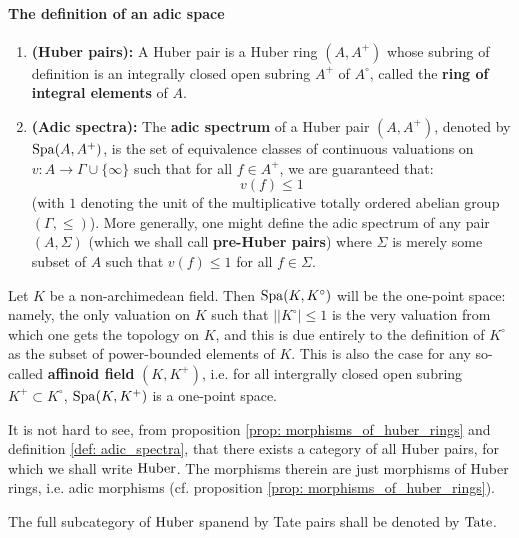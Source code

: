                 \paragraph{The definition of an adic space}
                    \begin{definition} \label{def: adic_spectra}
                        \noindent
                        \begin{enumerate}
                            \item \textbf{(Huber pairs):} A Huber pair is a Huber ring $(A, A^+)$ whose subring of definition is an integrally closed open subring $A^+$ of $A^{\circ}$, called the \textbf{ring of integral elements} of $A$.
                            \item \textbf{(Adic spectra):} The \textbf{adic spectrum} of a Huber pair $(A, A^+)$, denoted by $\mathrm{Spa} (A, A^+)$, is the set of equivalence classes of continuous valuations on $v: A \to \Gamma \cup \{\infty\}$ such that for all $f \in A^+$, we are guaranteed that:
                                $$v(f) \leq 1$$
                            (with $1$ denoting the unit of the multiplicative totally ordered abelian group $(\Gamma, \leq)$). More generally, one might define the adic spectrum of any pair $(A, \Sigma)$ (which we shall call \textbf{pre-Huber pairs}) where $\Sigma$ is merely some subset of $A$ such that $v(f) \leq 1$ for all $f \in \Sigma$. 
                        \end{enumerate}
                    \end{definition}
                    \begin{example} \label{example: affinoid_fields}
                        Let $K$ be a non-archimedean field. Then $\mathrm{Spa}(K, K^{\circ})$ will be the one-point space: namely, the only valuation on $K$ such that $||K^{\circ}| \leq 1$ is the very valuation from which one gets the topology on $K$, and this is due entirely to the definition of $K^{\circ}$ as the subset of power-bounded elements of $K$. This is also the case for any so-called \textbf{affinoid field} $(K, K^+)$, i.e. for all intergrally closed open subring $K^+ \subset K^{\circ}$, $\mathrm{Spa}(K, K^+)$ is a one-point space.
                    \end{example}
                    \begin{remark}
                        It is not hard to see, from proposition \ref{prop: morphisms_of_huber_rings} and definition \ref{def: adic_spectra}, that there exists a category of all Huber pairs, for which we shall write $\mathrm{Huber}$. The morphisms therein are just morphisms of Huber rings, i.e. adic morphisms (cf. proposition \ref{prop: morphisms_of_huber_rings}).
                        
                        The full subcategory of $\mathrm{Huber}$ spanend by Tate pairs shall be denoted by $\mathrm{Tate}$.
                    \end{remark}
                    
